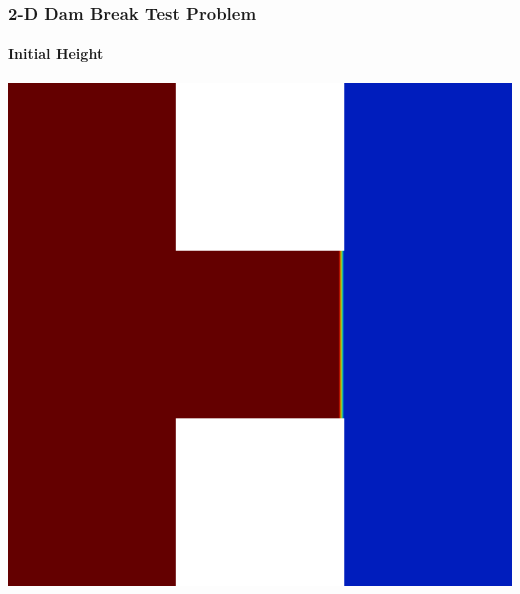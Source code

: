 \begin{frame}
\frametitle{2-D Dam Break Test Problem}
\framesubtitle{Initial Height}

\begin{center}
\includegraphics[height=0.8\textheight]{./figures/dambreak2d_initial.png}
\end{center}

\end{frame}
